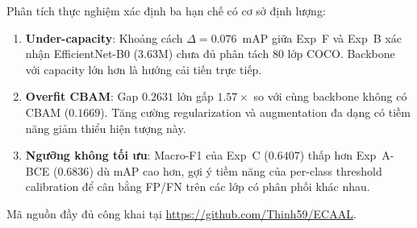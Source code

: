\documentclass[conference]{IEEEtran}
\begin{document}
Phân tích thực nghiệm xác định ba hạn chế có cơ sở định lượng:
\begin{enumerate}[leftmargin=1.8em]
  \item \textbf{Under-capacity}: Khoảng cách $\Delta{=}0.076$~mAP
        giữa Exp~F và Exp~B xác nhận EfficientNet-B0 ($3.63$M)
        chưa đủ phân tách 80 lớp COCO. Backbone với capacity
        lớn hơn là hướng cải tiến trực tiếp.
  \item \textbf{Overfit CBAM}: Gap $0.2631$ lớn gấp $1.57\times$
        so với cùng backbone không có CBAM ($0.1669$).
        Tăng cường regularization và augmentation đa dạng
        có tiềm năng giảm thiểu hiện tượng này.
  \item \textbf{Ngưỡng không tối ưu}: Macro-F1 của Exp~C ($0.6407$)
        thấp hơn Exp~A-BCE ($0.6836$) dù mAP cao hơn,
        gợi ý tiềm năng của per-class threshold calibration
        để cân bằng FP/FN trên các lớp có phân phối khác nhau.
\end{enumerate}

Mã nguồn đầy đủ công khai tại \url{https://github.com/Thinh59/ECAAL}.
\end{document}
